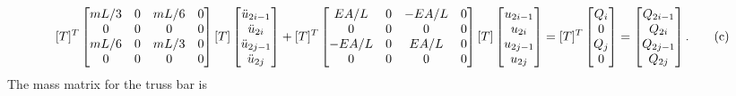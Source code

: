 \documentclass{AeroStructure-ERJohnson}
\begin{document}
\begin{align}\label{eq18.7c}
[T]^{T}\left[\begin{array}{@{}cccc@{}}m L/3 & 0 & m L/6 & 0 \\0 & 0 & 0 & 0 \\m L/6 & 0 & m L/3 & 0 \\0 & 0 & 0 & 0\end{array}\right][T]\left[\begin{array}{@{}c@{}}\ddot{u}_{2 i-1} \\\ddot{u}_{2 i} \\\ddot{u}_{2 j-1} \\\ddot{u}_{2 j}\end{array}\right]+[T]^{T}\left[\begin{array}{@{}cccc@{}}E A/L & 0 & -E A/L & 0 \\0 & 0 & 0 & 0 \\-E A/L & 0 & E A/L & 0 \\0 & 0 & 0 & 0\end{array}\right][T]\left[\begin{array}{@{}c@{}}u_{2 i-1} \\u_{2 i} \\u_{2 j-1} \\u_{2 j}\end{array}\right]=[T]^{T}\left[\begin{array}{@{}c@{}}Q_{i} \\0 \\Q_{j} \\0\end{array}\right]=\left[\begin{array}{@{}c@{}}Q_{2 i-1} \\Q_{2 i} \\Q_{2 j-1} \\Q_{2 j}\end{array}\right].\tag{c}
\end{align}\setcounter{equation}{134}
The mass matrix for the truss bar is
\end{document}
